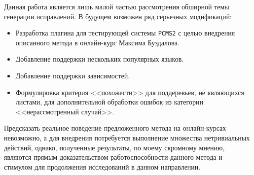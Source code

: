 \documentclass[times,specification,annotation]{itmo-student-thesis}
\begin{document}
Данная работа является лишь малой частью рассмотрения обширной темы генерации исправлений. В будущем возможен ряд серьезных
модификаций:
\begin{itemize}
    \item Разработка плагина для тестирующей системы \texttt{PCMS2} с целью внедрения описанного метода в онлайн-курс
        Максима Буздалова.
    \item Добавление поддержки нескольких популярных языков.
    \item Добавление поддержки зависимостей.
    \item Формулировка критерия <<похожести>> для поддеревьев, не являющихся листами, для дополнительной обработки ошибок из
        категории <<нерассмотренный случай>>.
\end{itemize}

Предсказать реальное поведение предложенного метода на онлайн-курсах невозможно, а для внедрения потребуется выполнение множества
нетривиальных действий, однако, полученные результаты, по моему скромному мнению, являются прямым доказательством работоспособности 
данного метода и стимулом для продолжения исследований в данном направлении.



\printmainbibliography

\end{document}
